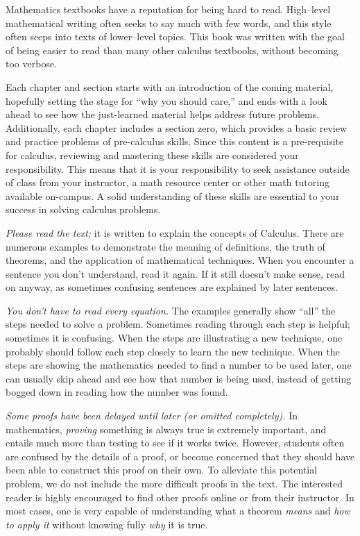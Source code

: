 Mathematics textbooks have a reputation for being hard to read. High--level mathematical writing often seeks to say much with few words, and this style often seeps into texts of lower--level topics. This book was written with the goal of being easier to read than many other calculus textbooks, without becoming too verbose. 

Each chapter and section starts with an introduction of the coming material, hopefully setting the stage for ``why you should care,'' and ends with a look ahead to see how the just-learned material helps address future problems. Additionally, each chapter includes a section zero, which provides a basic review and practice problems of pre-calculus skills. Since this content is a pre-requisite for calculus, reviewing and mastering these skills are considered your responsibility. This means that it is your responsibility to seek assistance outside of class from your instructor, a math resource center or other math tutoring available on-campus.  A solid understanding of these skills are essential to your success in solving calculus problems.

\textit{Please read the text;} it is written to explain the concepts of Calculus. There are numerous examples to demonstrate the meaning of definitions, the truth of theorems, and the application of mathematical techniques. When you encounter a sentence you don't understand, read it again. If it still doesn't make sense, read on anyway, as sometimes confusing sentences are explained by later sentences.

\textit{You don't have to read every equation.} The examples generally show ``all'' the steps needed to solve a problem. Sometimes reading through each step is helpful; sometimes it is confusing. When the steps are illustrating a new technique, one probably should follow each step closely to learn the new technique. When the steps are showing the mathematics needed to find a number to be used later, one can usually skip ahead and see how that number is being used, instead of getting bogged down in reading how the number was found.

\textit{Some proofs have been delayed until later (or omitted completely).} In mathematics, \textit{proving} something is always true is extremely important, and entails much more than testing to see if it works twice. However, students often are confused by the details of a proof, or become concerned that they should have been able to construct this proof on their own. To alleviate this potential problem, we do not include the more difficult proofs in the text.
The interested reader is highly encouraged to find other proofs online or from their instructor. In most cases, one is very capable of understanding what a theorem \textit{means} and \textit{how to apply it} without knowing fully \textit{why} it is true.


